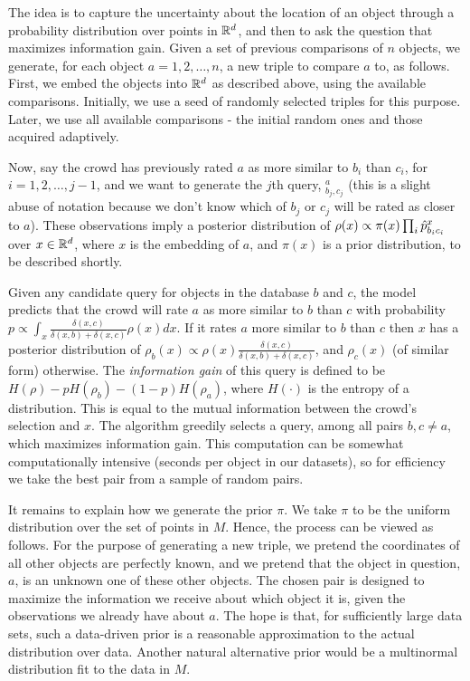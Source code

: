 \documentclass{article}
\begin{document}
The idea is to capture the uncertainty about the
location of an object through a probability distribution over points
in $\mathbb{R}^d$, and then to ask the question that maximizes information
gain. Given a set of previous comparisons of $n$ objects, we generate, for
each object $a=1,2,\ldots,n$, a new triple to compare $a$ to, as
follows.  First, we embed the objects into $\mathbb{R}^d$ as described
above, using the available comparisons. Initially, we use a seed of
randomly selected triples for this purpose. Later, we use all
available comparisons - the initial random ones and those acquired
adaptively.

Now, say the crowd has previously rated $a$ as more similar to $b_i$
than $c_i$, for $i=1,2,\ldots,j-1$, and we want to generate the $j$th
query, $^a_{b_j,c_j}$ (this is a slight abuse of notation because we
don't know which of $b_j$ or $c_j$ will be rated as closer to
$a$). These observations imply a posterior distribution of $\rho(x)
\propto \pi(x) \prod_i \hat{p}^{x}_{b_ic_i}$ over $x \in \mathbb{R}^d$, where
$x$ is the embedding of $a$, and $\pi(x)$ is a prior distribution, to
be described shortly.

Given any candidate query for objects in the database $b$ and $c$, the
model predicts that the crowd will rate $a$ as more similar to $b$
than $c$ with probability $p \propto \int_x
\frac{\delta(x,c)}{\delta(x,b)+\delta(x,c)}\rho(x)dx$.  If it rates $a$ more similar to $b$ than $c$ then
$x$ has a posterior distribution of $\rho_b(x) \propto
\rho(x)\frac{\delta(x,c)}{\delta(x,b)+\delta(x,c)}$, and $\rho_c(x)$
(of similar form) otherwise.  The {\em information gain} of this query
is defined to be $H(\rho)-pH(\rho_b)-(1-p)H(\rho_a)$, where $H(\cdot)$
is the entropy of a distribution. This is equal to the mutual
information between the crowd's selection and $x$. The algorithm
greedily selects a query, among all pairs $b,c \neq a$, which
maximizes information gain.  This computation can be somewhat
computationally intensive (seconds per object in our datasets), so for
efficiency we take the best pair from a sample of random pairs.

It remains to explain how we generate the prior $\pi$.  We take $\pi$
to be the uniform distribution over the set of points in $M$.  Hence,
the process can be viewed as follows.  For the purpose of generating a
new triple, we pretend the coordinates of all other objects are
perfectly known, and we pretend that the object in question, $a$, is
an unknown one of these other objects.  The chosen pair is designed to
maximize the information we receive about which object it is, given
the observations we already have about $a$.  The hope is that, for
sufficiently large data sets, such a data-driven prior is a reasonable
approximation to the actual distribution over data.  Another natural
alternative prior would be a multinormal distribution fit to the data
in $M$.
\end{document}
